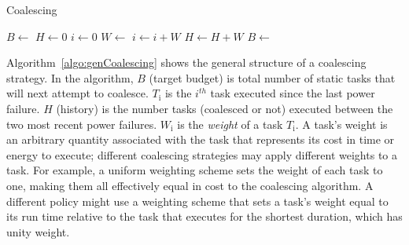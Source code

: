 %
%
\begin{algorithm}[t]
	\caption{Coalescing}
	\label{algo:genCoalescing}
	\scriptsize
	\begin{algorithmic}[1]
        \State $B \leftarrow $ 
        \State $H \gets 0$ 
	        \State $ i \gets 0$
		        \State {}
		        \State $W \leftarrow $ 
		        \State $i \gets i + W$
				\State $H \gets H + W$
	        \EndWhile
	        \State {}
	        \State $B \leftarrow $ 
        \EndWhile
	\end{algorithmic}
\end{algorithm}
%
%
Algorithm~\ref{algo:genCoalescing} shows the general structure of a coalescing
strategy. In the algorithm, $B$ (target budget) is total number of static tasks
that \sys will next attempt to coalesce. $T_\text{i}$ is the $i^{th}$ task
executed since the last power failure. $H$ (history) is the number tasks
(coalesced or not) executed between the two most recent power failures.
$W_\text{i}$ is the {\em weight} of a task $T_\text{i}$.  A task's weight is an
arbitrary quantity associated with the task that represents its cost in time or
energy to execute; different coalescing strategies may apply different weights
to a task.  For example, a uniform weighting scheme sets the weight of each
task to one, making them all effectively equal in cost to the coalescing
algorithm.  A different policy might use a weighting scheme that sets a task's
weight equal to its run time relative to the task that executes for the
shortest duration, which has unity weight. 

